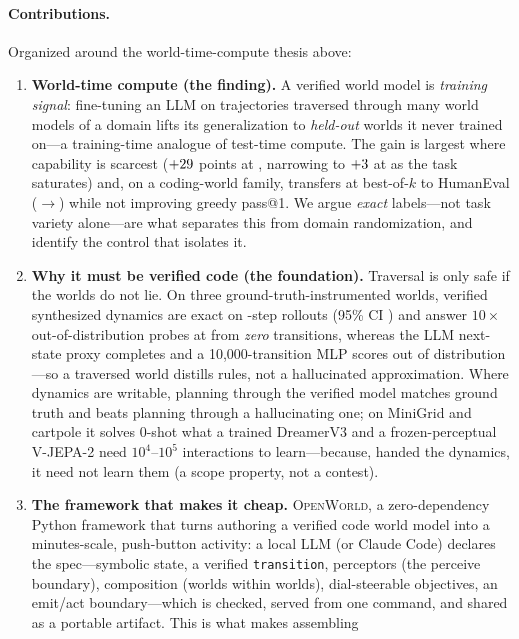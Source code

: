 \documentclass[11pt]{article}
\newcommand{\openworld}{\textsc{OpenWorld}}
\begin{document}
\paragraph{Contributions.} Organized around the world-time-compute thesis above:
\begin{enumerate}
  \item \textbf{World-time compute (the finding).} A verified world model is
  \emph{training signal}: fine-tuning an LLM on trajectories traversed through many world
  models of a domain lifts its generalization to \emph{held-out} worlds it never trained
  on---a training-time analogue of test-time compute. The gain is largest where capability
  is scarcest ($+29$ points at \WTSmallName, narrowing to $+3$ at
  \WTLargeName{} as the task saturates) and, on a coding-world family, transfers at
  best-of-$k$ to HumanEval (\CodeHeBaseFive$\to$\CodeHeFtFive) while not improving greedy
  pass@1. We argue \emph{exact} labels---not task variety alone---are what separates this
  from domain randomization, and identify the control that isolates it.
  \item \textbf{Why it must be verified code (the foundation).} Traversal is only safe if
  the worlds do not lie. On three ground-truth-instrumented worlds, verified synthesized
  dynamics are exact on \MultiCodeExact{} \RolloutSteps-step rollouts (95\% CI
  \MultiCodeCI) and answer $10\times$ out-of-distribution probes at \CodeOODRate{} from
  \emph{zero} transitions, whereas the LLM next-state proxy completes \MultiLLMExact{} and
  a 10{,}000-transition MLP scores \MLPOODTenK{} out of distribution---so a traversed world
  distills rules, not a hallucinated approximation. Where dynamics are writable, planning
  through the verified model matches ground truth and beats planning through a
  hallucinating one; on MiniGrid and cartpole it solves $0$-shot what a trained DreamerV3
  and a frozen-perceptual V-JEPA-2 need $10^4$--$10^5$ interactions to learn---because,
  handed the dynamics, it need not learn them (a scope property, not a contest).
  \item \textbf{The framework that makes it cheap.} \openworld, a zero-dependency Python
  framework that turns authoring a verified code world model into a minutes-scale,
  push-button activity: a local LLM (or Claude Code) declares the spec---symbolic state, a
  verified \texttt{transition}, perceptors (the perceive boundary), composition (worlds
  within worlds), dial-steerable objectives, an emit/act boundary---which is checked,
  served from one command, and shared as a portable artifact. This is what makes assembling

\end{enumerate}
\end{document}
